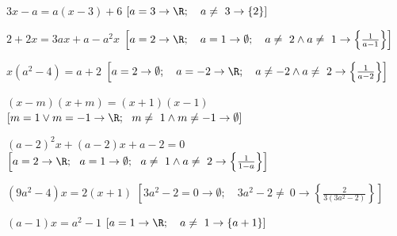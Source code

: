 \begin{esercizio}[*]
\begin{enumeratea}
% 
 \item \(3x-a=a(x-3)+6\)
\hfill \(\left[a=3 \rightarrow \R; \quad a\neq~3 \rightarrow \{2\}\right]\)
 \item \(2+2x=3ax+a-a^{2}x\)
\hfill \(\left[a=2 \rightarrow \R; \quad 
a=1 \rightarrow \emptyset; \quad 
a\neq~2\wedge a\neq~1 \rightarrow \left\{\frac{1}{a-1}\right\}\right]\)
 \item \(x(a^{2}-4)=a+2\)
\hfill \(\left[a=2 \rightarrow \emptyset; \quad 
a=-2 \rightarrow \R; \quad 
a\neq -2\wedge a\neq~2 \rightarrow \left\{\frac{1}{a-2}\right\}\right]\)
 \item \((x-m)(x+m)=(x+1)(x-1)\)
\hfill \(\left[m=1\vee m=-1 \rightarrow \R; ~~ 
m\neq~1\wedge m\neq -1 \rightarrow \emptyset\right]\)
 \item \((a-2)^{2}x+(a-2)x+a-2=0\)
\hfill \(\left[a=2 \rightarrow \R; ~~ 
a=1 \rightarrow \emptyset; ~~ 
a\neq~1\wedge a\neq~2 \rightarrow \left\{\frac{1}{1-a}\right\}\right]\)
 \item \(\left(9a^{2}-4\right)x=2(x+1)\)
\hfill \(\left[3a^{2}-2=0 \rightarrow \emptyset; \quad 
3a^{2}-2\neq~0 \rightarrow \left\{\frac{2}{3(3a^{2}-2)}\right\}\right]\)
 \item \((a-1)x=a^{2}-1\)
\hfill \(\left[a=1 \rightarrow \R; \quad 
a\neq~1 \rightarrow \{a+1\}\right]\)

\end{enumeratea}
\end{esercizio}

